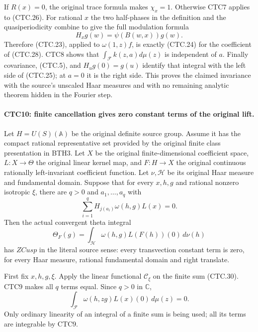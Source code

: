 If $R(x)=0$, the original trace formula makes $\chi_x=1$.
Otherwise CTC7 applies to (CTC.26).  For rational $x$ the two
half-phases in the definition and the quasiperiodicity combine to
give the full modulation formula
\[
                             H_xg(w)=\psi(B(w,x))g(w).
 \tag{CTC.29}
\]
Therefore (CTC.23), applied to $\omega(1,z)f$, is exactly
(CTC.24) for the coefficient of (CTC.28).  CTC8 shows that
$\int_{\mathcal F}k(z,a)d\mu(z)$ is independent of $a$.
Finally covariance, (CTC.5), and $H_u g(0)=g(u)$ identify that
integral with the left side of (CTC.25); at $a=0$ it is the right
side.  This proves the claimed invariance with the source's
unscaled Haar measures and with no remaining analytic theorem
hidden in the Fourier step.

\paragraph{CTC10: finite cancellation gives zero constant terms of the original lift.}
\label{claim:CTC10}
Let $H=U(S)(\mathbb A)$ be the original definite source group.
Assume it has the compact rational representative set provided
by the original finite class presentation in BTH3.  Let $X$ be the
original finite-dimensional coefficient space, $L:X\to\Theta$
the original linear kernel map, and $F:H\to X$ the original
continuous rationally left-invariant coefficient function.  Let
$\nu,\mathcal H$ be its original Haar measure and fundamental
domain.  Suppose that for every $x,h,g$ and rational nonzero
isotropic $\xi$, there are $q>0$ and $a_1,\ldots,a_q$ with
\[
             \sum_{i=1}^q H_{j(a_i)}\omega(h,g)L(x)=0.
 \tag{CTC.30}
\]
Then the actual convergent theta integral
\[
                 \Theta_F(g)=\int_{\mathcal H}
                                 \omega(h,g)L(F(h))(0)\,d\nu(h)
 \tag{CTC.31}
\]
has $ZCusp$ in the literal source sense: every transvection
constant term is zero, for every Haar measure, rational fundamental
domain and right translate.

First fix $x,h,g,\xi$.  Apply the linear functional
$\mathcal C_\xi$ on the finite sum (CTC.30).  CTC9 makes all
$q$ terms equal.  Since $q>0$ in $\mathbb C$,
\[
          \int_{\mathcal F}\omega(h,zg)L(x)(0)\,d\mu(z)=0.
 \tag{CTC.32}
\]
Only ordinary linearity of an integral of a finite sum is being
used; all its terms are integrable by CTC9.

